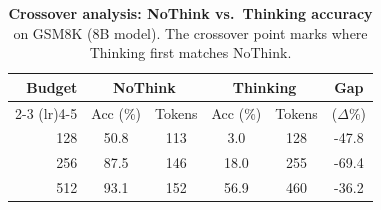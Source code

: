 \begin{table}[t]
\centering
\caption{\textbf{Crossover analysis: NoThink vs.\ Thinking accuracy} on GSM8K (8B model). The crossover point marks where Thinking first matches NoThink.}
\label{tab:crossover}
\small
\begin{tabular}{r cc cc c}
\toprule
Budget & \multicolumn{2}{c}{NoThink} & \multicolumn{2}{c}{Thinking} & Gap \\
\cmidrule(lr){2-3} \cmidrule(lr){4-5}
 & Acc (\%) & Tokens & Acc (\%) & Tokens & ($\Delta$\%) \\
\midrule
128 & 50.8 & 113 & 3.0 & 128 & -47.8 \\
256 & 87.5 & 146 & 18.0 & 255 & -69.4 \\
512 & 93.1 & 152 & 56.9 & 460 & -36.2 \\
\bottomrule
\end{tabular}
\end{table}
